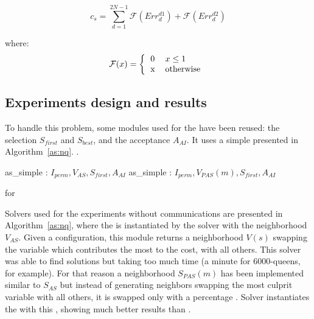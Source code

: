\begin{equation}\label{func:cost_nqp}
c_s=\sum_{d=1}^{2N-1}{\mathcal{F}(Err^{d1}_{d}) + \mathcal{F}(Err^{d2}_{d})}
\end{equation}

where:
\begin{equation*}
\mathcal{F}(x)=\left\{
\begin{tabular}{ll}
0 & $x \leq 1$ \\
x & otherwise
\end{tabular}
\right.
\end{equation*}

\subsection{Experiments design and results}

To handle this problem, some modules used for the \sgp{} have been reused: the selection \oms{} $S_{first}$ and $S_{best}$, and the acceptance \om{} $A_{AI}$. It uses a simple \as{} presented in Algorithm~\ref{as:nq}. . 

\begin{algorithm}[H]
\dontprintsemicolon
\SetNoline
{}
   as\_simple\;
\algoindent {} : $I_{perm}, V_{AS}, S_{first}, A_{AI}$ \;
   as\_simple\;
\algoindent {} : $I_{perm}, V_{PAS}(m), S_{first}, A_{AI}$ \; 
\caption{\As{} for \NQP}\label{as:nq}
\end{algorithm}

Solvers used for the experiments without communications are presented in Algorithm~\ref{as:nq}, where the \as{} is instantiated by the solver  with the neighborhood \om{} $V_{AS}$. Given a configuration, this module returns a neighborhood $V\left(s\right)$ swapping the variable which contributes the most to the cost, with all others. This solver was able to find solutions but taking too much time (a minute for 6000-queens, for example). For that reason a neighborhood \om{} $S_{PAS}(m)$ has been implemented similar to $S_{AS}$ but instead of generating neighbors swapping the most culprit variable with all others, it is swapped only with a percentage . Solver  instantiates the \as{} with this \om, showing much better results than .

